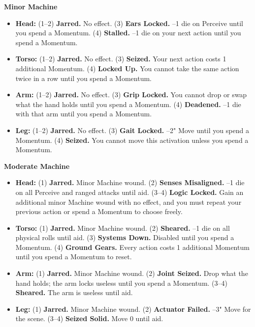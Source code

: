\textbf{Minor Machine}
\begin{itemize}
    \item \textbf{Head:} (1--2) \textbf{Jarred.} No effect. (3) \textbf{Ears Locked.} --1 die on Perceive until you spend a Momentum. (4) \textbf{Stalled.} --1 die on your next action until you spend a Momentum.
    \item \textbf{Torso:} (1--2) \textbf{Jarred.} No effect. (3) \textbf{Seized.} Your next action costs 1 additional Momentum. (4) \textbf{Locked Up.} You cannot take the same action twice in a row until you spend a Momentum.
    \item \textbf{Arm:} (1--2) \textbf{Jarred.} No effect. (3) \textbf{Grip Locked.} You cannot drop or swap what the hand holds until you spend a Momentum. (4) \textbf{Deadened.} --1 die with that arm until you spend a Momentum.
    \item \textbf{Leg:} (1--2) \textbf{Jarred.} No effect. (3) \textbf{Gait Locked.} --2" Move until you spend a Momentum. (4) \textbf{Seized.} You cannot move this activation unless you spend a Momentum.
\end{itemize}

\textbf{Moderate Machine}
\begin{itemize}
    \item \textbf{Head:} (1) \textbf{Jarred.} Minor Machine wound. (2) \textbf{Senses Misaligned.} --1 die on all Perceive and ranged attacks until aid. (3--4) \textbf{Logic Locked.} Gain an additional minor Machine wound with no effect, and you must repeat your previous action or spend a Momentum to choose freely.
    \item \textbf{Torso:} (1) \textbf{Jarred.} Minor Machine wound. (2) \textbf{Sheared.} --1 die on all physical rolls until aid. (3) \textbf{Systems Down.} Disabled until you spend a Momentum. (4) \textbf{Ground Gears.} Every action costs 1 additional Momentum until you spend a Momentum to reset.
    \item \textbf{Arm:} (1) \textbf{Jarred.} Minor Machine wound. (2) \textbf{Joint Seized.} Drop what the hand holds; the arm locks useless until you spend a Momentum. (3--4) \textbf{Sheared.} The arm is useless until aid.
    \item \textbf{Leg:} (1) \textbf{Jarred.} Minor Machine wound. (2) \textbf{Actuator Failed.} --3" Move for the scene. (3--4) \textbf{Seized Solid.} Move 0 until aid.
\end{itemize}

